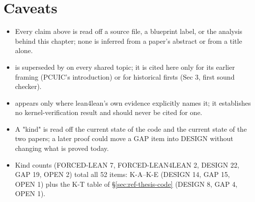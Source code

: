 \section*{Caveats}

\begin{itemize}
\item Every claim above is read off a source file, a blueprint label, or the analysis behind
this chapter; none is inferred from a paper's abstract or from a title alone.
\item {} is superseded by  on every shared topic; it is cited here only for its earlier
framing (PCUIC's introduction) or for historical firsts (Sec 3, first sound checker).
\item {} appears only where lean4lean's own evidence explicitly names it; it establishes no
kernel-verification result and should never be cited for one.
\item A "kind" is read off the current state of the code and the current state of the two
papers; a later proof could move a GAP item into DESIGN without changing what is proved today.
\item Kind counts (FORCED-LEAN 7, FORCED-LEAN4LEAN 2, DESIGN 22, GAP 19, OPEN 2) total all 52
items: K-A--K-E (DESIGN 14, GAP 15, OPEN 1) plus the K-T table of \S\ref{sec:ref-thesis-code}
(DESIGN 8, GAP 4, OPEN 1).
\end{itemize}
